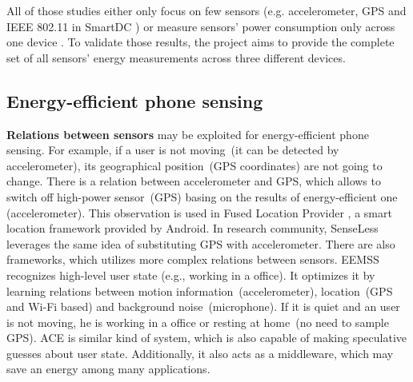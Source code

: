 All of those studies either only focus on few sensors (e.g. accelerometer, GPS and IEEE 802.11 in SmartDC \cite{chon:smartdc}) or measure sensors' power consumption only across one device \cite{benabdesslem:senseless}. To validate those results, the project aims to provide the complete set of all sensors' energy measurements across three different devices. 
	
\subsection{Energy-efficient phone sensing}
\textbf{Relations between sensors} may be exploited for energy-efficient phone sensing. For example, if a user is not moving\ (it can be detected by accelerometer), its geographical position\ (GPS coordinates) are not going to change. There is a relation between accelerometer and GPS, which allows to switch off high-power sensor\ (GPS) basing on the results of energy-efficient one (accelerometer). This observation is used in Fused Location Provider \cite{android:locationapi}, a smart location framework provided by Android. In research community, SenseLess \cite{benabdesslem:senseless} leverages the same idea of substituting GPS with accelerometer. There are also frameworks, which utilizes more complex relations between sensors. EEMSS \cite{wang:eemss} recognizes high-level user state (e.g., working in a office). It optimizes it by learning relations between motion information\ (accelerometer), location\ (GPS and Wi-Fi based) and background noise\ (microphone). If it is quiet and an user is not moving, he is working in a office or resting at home\ (no need to sample GPS). ACE \cite{nath:ace} is similar kind of system, which is also capable of making speculative guesses about user state. Additionally, it also acts as a middleware, which may save an energy among many applications.


